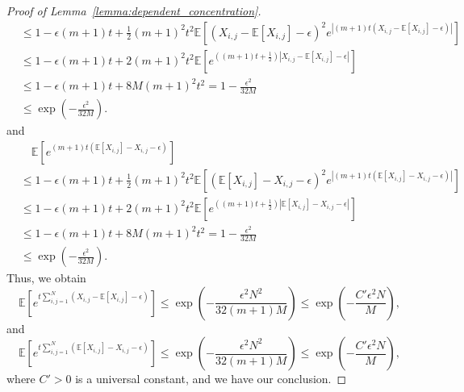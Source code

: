 \begin{proof}[Proof of Lemma~\ref{lemma:dependent_concentration}]
\begin{align*}
    &\leq 1 -\epsilon (m+1) t+\frac{1}{2}(m+1)^2t^2\mathbb{E}\left[(X_{i,j} - \mathbb{E}[X_{i,j}]-\epsilon)^2 e^{|(m+1)t (X_{i,j} - \mathbb{E}[X_{i,j}]-\epsilon)|}\right]\\
    &\leq 1 -\epsilon(m+1)t+2(m+1)^2t^2\mathbb{E}\left[e^{((m+1)t+\frac{1}{2}) |X_{i,j} - \mathbb{E}[X_{i,j}]-\epsilon|}\right]\\
    &\leq 1-\epsilon (m+1)t + 8M(m+1)^2t^2 = 1-\frac{\epsilon^2}{32M}\\
    &\leq \exp \left(-\frac{ \epsilon^2}{32M} \right).
\end{align*}
and
\begin{align*}
    &\quad \mathbb{E}\left[e^{(m+1)t (\mathbb{E}[X_{i,j}]- X_{i,j}-\epsilon)} \right]\\
    &\leq 1 -\epsilon (m+1) t+\frac{1}{2}(m+1)^2t^2\mathbb{E}\left[(\mathbb{E}[X_{i,j}]- X_{i,j}-\epsilon)^2 e^{|(m+1)t (\mathbb{E}[X_{i,j}]- X_{i,j}-\epsilon)|}\right]\\
    &\leq 1 -\epsilon(m+1)t+2(m+1)^2t^2\mathbb{E}\left[e^{((m+1)t+\frac{1}{2}) |\mathbb{E}[X_{i,j}]- X_{i,j}-\epsilon|}\right]\\
    &\leq 1-\epsilon (m+1)t + 8M(m+1)^2t^2 = 1-\frac{\epsilon^2}{32M} \\
    &\leq \exp \left(-\frac{ \epsilon^2}{32M} \right).
\end{align*}
Thus, we obtain 
\begin{equation*}
\mathbb{E}\left [e^{t \sum_{i,j=1}^N (X_{i,j} - \mathbb{E}[X_{i,j}] - \epsilon)}\right ] \leq \exp \left(- \frac{ \epsilon^2N^2}{32(m+1)M} \right) \leq \exp \left(- \frac{ C'\epsilon^2N}{M} \right),
\end{equation*}
and 
\begin{equation*}
\mathbb{E}\left [e^{t \sum_{i,j=1}^N ( \mathbb{E}[X_{i,j}] -X_{i,j} - \epsilon)}\right ] \leq \exp \left(- \frac{ \epsilon^2N^2}{32(m+1)M} \right) \leq \exp \left(- \frac{ C'\epsilon^2N}{M} \right),
\end{equation*}
where $C'>0$ is a universal constant, and we have our conclusion.
\end{proof}
